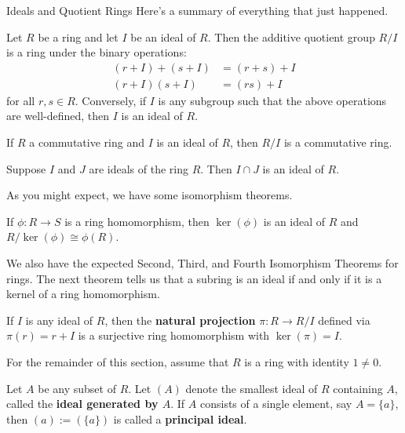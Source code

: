 \begin{section}{Ideals and Quotient Rings}
Here's a summary of everything that just happened.

\begin{theorem}
Let $R$ be a ring and let $I$ be an ideal of $R$.  Then the additive quotient group $R/I$ is a ring under the binary operations:
\begin{align}
(r+I)+(s+I) & =  (r+s)+I\\
(r+I)(s+I) & = (rs)+I
\end{align}
for all $r,s\in R$.  Conversely, if $I$ is any subgroup such that the above operations are well-defined, then $I$ is an ideal of $R$.
\end{theorem}

\begin{theorem}
If $R$ a commutative ring and $I$ is an ideal of $R$, then $R/I$ is a commutative ring.
\end{theorem}

\begin{theorem}
Suppose $I$ and $J$ are ideals of the ring $R$.  Then $I\cap J$ is an ideal of $R$.
\end{theorem}

As you might expect, we have some isomorphism theorems.

\begin{theorem}
If $\phi:R\to S$ is a ring homomorphism, then $\ker(\phi)$ is an ideal of $R$ and $R/\ker(\phi)\cong \phi(R)$.
\end{theorem}


We also have the expected Second, Third, and Fourth Isomorphism Theorems for rings.  The next theorem tells us that a subring is an ideal if and only if it is a kernel of a ring homomorphism.

\begin{theorem}
If $I$ is any ideal of $R$, then the \textbf{natural projection} $\pi:R\to R/I$ defined via $\pi(r)=r+I$ is a surjective ring homomorphism with $\ker(\pi)=I$.
\end{theorem}

For the remainder of this section, assume that $R$ is a ring with identity $1\neq 0$.

\begin{definition}
Let $A$ be any subset of $R$. Let $(A)$ denote the smallest ideal of $R$ containing $A$, called the \textbf{ideal generated by $A$}. If $A$ consists of a single element, say $A=\{a\}$, then $(a):=(\{a\})$ is called a \textbf{principal ideal}.
\end{definition}


\end{section}

